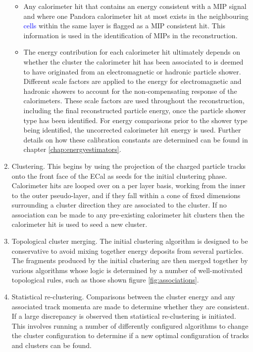 \begin{enumerate}
\begin{itemize}
\item Any calorimeter hit that contains an energy consistent with a MIP signal and where one Pandora calorimeter hit at most exists in the neighbouring \textcolor{blue}{cells} within the same layer is flagged as a MIP consistent hit.  This information is used in the identification of MIPs in the reconstruction.
\item The energy contribution for each calorimeter hit ultimately depends on whether the cluster the calorimeter hit has been associated to is deemed to have originated from an electromagnetic or hadronic particle shower.  Different scale factors are applied to the energy for electromagnetic and hadronic showers to account for the non-compensating response of the calorimeters.  These scale factors are used throughout the reconstruction, including the final reconstructed particle energy, once the particle shower type has been identified.  For energy comparisons prior to the shower type being identified, the uncorrected calorimeter hit energy is used.  Further details on how these calibration constants are determined can be found in chapter \ref{chap:energyestimators}.  
\end{itemize}
\item Clustering.  This begins by using the projection of the charged particle tracks onto the front face of the ECal as seeds for the initial clustering phase.  Calorimeter hits are looped over on a per layer basis, working from the inner to the outer pseudo-layer, and if they fall within a cone of fixed dimensions surrounding a cluster direction they are associated to the cluster.  If no association can be made to any pre-existing calorimeter hit clusters then the calorimeter hit is used to seed a new cluster.  
\item Topological cluster merging.  The initial clustering algorithm is designed to be conservative to avoid mixing together energy deposits from several particles.  The fragments produced by the initial clustering are then merged together by various algorithms whose logic is determined by a number of well-motivated topological rules, such as those shown figure \ref{fig:associations}.  
\item Statistical re-clustering.  Comparisons between the cluster energy and any associated track momenta are made to determine whether they are consistent.  If a large discrepancy is observed then statistical re-clustering is initiated.  This involves running a number of differently configured algorithms to change the cluster configuration to determine if a new optimal configuration of tracks and clusters can be found.  


\end{enumerate}
